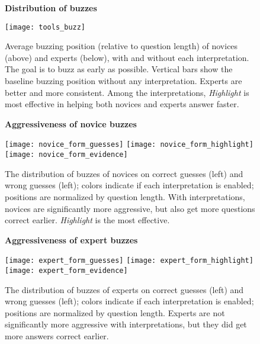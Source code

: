
\begin{figure}[t]
    \centering
    \textbf{Distribution of buzzes}\par\medskip
    \texttt{[image: tools\_buzz]}
    \caption{\label{fig:tools_buzz} Average buzzing position (relative
    to question length) of novices (above) and experts (below),
    with and without each interpretation. The goal is to buzz as early
    as possible.
    Vertical bars show the baseline buzzing position without any
    interpretation.
    Experts are better and more consistent.
    Among the interpretations, \emph{Highlight} is
    most effective in helping both novices and experts answer faster.}
\end{figure}

\begin{figure}[t]
\centering
\textbf{Aggressiveness of novice buzzes}\par\medskip
\texttt{[image: novice\_form\_guesses]}
\texttt{[image: novice\_form\_highlight]}
\texttt{[image: novice\_form\_evidence]}
\caption{\label{fig:aggressive_novice} The distribution of buzzes of
    novices on correct guesses (left) and wrong guesses (left); colors
    indicate if each interpretation is enabled; positions are
    normalized by question length.  With interpretations, novices are
    significantly more aggressive, but also get more questions correct
    earlier. \emph{Highlight} is the most effective.}
\end{figure}

\begin{figure}[t]
\centering
\textbf{Aggressiveness of expert buzzes}\par\medskip
\texttt{[image: expert\_form\_guesses]}
\texttt{[image: expert\_form\_highlight]}
\texttt{[image: expert\_form\_evidence]}
    \caption{\label{fig:aggressive_expert} The distribution of buzzes
    of experts on correct guesses (left) and wrong guesses (left);
    colors indicate if each interpretation is enabled; positions are
    normalized by question length.  Experts are not significantly
    more aggressive with interpretations, but they did get more answers
    correct earlier.}
\end{figure}

